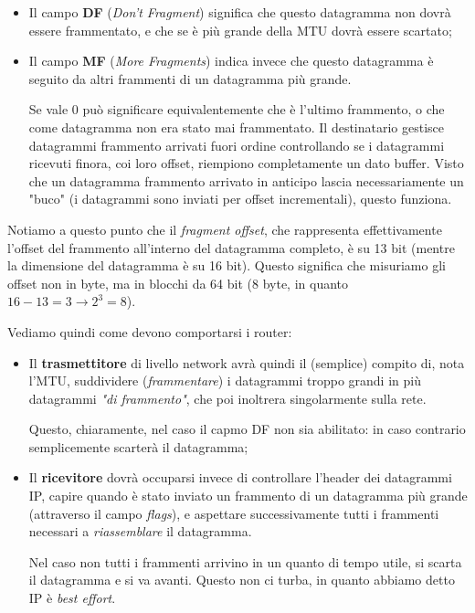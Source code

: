 \documentclass[a4paper,11pt]{article}
\begin{document}
\begin{itemize}
	\item Il campo \textbf{DF} (\textit{Don't Fragment}) significa che questo datagramma non dovrà essere frammentato, e che se è più grande della MTU dovrà essere scartato;
	\item Il campo \textbf{MF} (\textit{More Fragments}) indica invece che questo datagramma è seguito da altri frammenti di un datagramma più grande.

		Se vale 0 può significare equivalentemente che è l'ultimo frammento, o che come datagramma non era stato mai frammentato.
		Il destinatario gestisce datagrammi frammento arrivati fuori ordine controllando se i datagrammi ricevuti finora, coi loro offset, riempiono completamente un dato buffer. Visto che un datagramma frammento arrivato in anticipo lascia necessariamente un "buco" (i datagrammi sono inviati per offset incrementali), questo funziona. 
\end{itemize}

Notiamo a questo punto che il \textit{fragment offset}, che rappresenta effettivamente l'offset del frammento all'interno del datagramma completo, è su 13 bit (mentre la dimensione del datagramma è su 16 bit).
Questo significa che misuriamo gli offset non in byte, ma in blocchi da 64 bit (8 byte, in quanto $16 - 13 = 3 \rightarrow 2^3 = 8$).

Vediamo quindi come devono comportarsi i router:
\begin{itemize}
	\item Il \textbf{trasmettitore} di livello network avrà quindi il (semplice) compito di, nota l'MTU, suddividere (\textit{frammentare}) i datagrammi troppo grandi in più datagrammi \textit{"di frammento"}, che poi inoltrera singolarmente sulla rete. 

		Questo, chiaramente, nel caso il capmo DF non sia abilitato: in caso contrario semplicemente scarterà il datagramma;
	\item Il \textbf{ricevitore} dovrà occuparsi invece di controllare l'header dei datagrammi IP, capire quando è stato inviato un frammento di un datagramma più grande (attraverso il campo \textit{flags}), e aspettare successivamente tutti i frammenti necessari a \textit{riassemblare} il datagramma.

		Nel caso non tutti i frammenti arrivino in un quanto di tempo utile, si scarta il datagramma e si va avanti. Questo non ci turba, in quanto abbiamo detto IP è \textit{best effort}.
\end{itemize}
\end{document}
